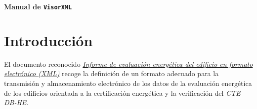 \documentclass[10pt,notitlepage,oneside,a4paper]{article}
\newcommand{\titulo}{Manual de \texttt{VisorXML}}
\newcommand{\subtitulo}{Visualización y edición de informes de eficiencia energética de edificios para Certificación y verficación del CTE~DB-HE}
\begin{document}
\thispagestyle{portada}
\null\vspace{5cm}
\begin{center}
{\Large \bfseries \titulo}
\vskip 0pt\vspace{0.5cm}{\large \subtitulo}
\end{center}

\null\vfill
\begin{center} \footnotesize


%

\end{center}
\vskip 0pt\vspace{1.5cm}
\clearpage

\newpage
\tableofcontents
\clearpage

\newpage
\section{Introducción}

El documento reconocido \href{http://www.minetur.gob.es/energia/desarrollo/EficienciaEnergetica/CertificacionEnergetica/DocumentosReconocidos/Documents/20150625\%20-\%20Informe\%20evaluaci\%C3\%B3n\%20energ\%C3\%A9tica\%20edificio\%20en\%20formato\%20elec\%20XML.pdf}{\textit{Informe de evaluación energética del edificio en formato electrónico (XML)}} recoge la definición de un formato adecuado para la transmisión y almacenamiento electrónico de los datos de la evaluación energética de los edificios orientada a la certificación energética y la verificación del \textit{CTE DB-HE}.
\end{document}
